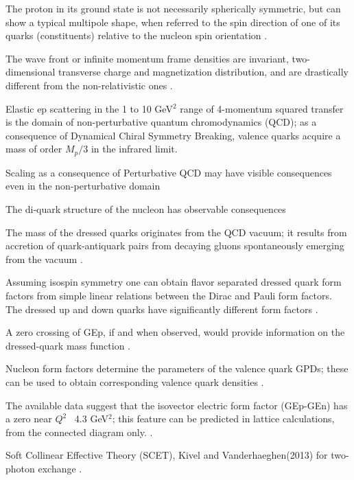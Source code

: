 The proton in its ground state is not necessarily spherically symmetric, but can show a typical multipole shape, 
when referred to the spin direction of one of its quarks (constituents) relative to the nucleon spin orientation
 \cite{miller03}. %

The wave front or infinite momentum frame densities are invariant, two-dimensional transverse charge and magnetization distribution, 
and are drastically different
from the non-relativistic ones \cite{miller:2003,carlson:2007}. %

Elastic ep scattering in the 1 to 10 GeV$^2$ range of 4-momentum squared transfer is
the domain of non-perturbative quantum chromodynamics (QCD); as a consequence of Dynamical Chiral Symmetry
Breaking, valence quarks acquire a mass of order $M_p/3$ in the infrared limit. \cite{cloet:2008b,cloet:2008}

   Scaling as a consequence of Perturbative QCD may have visible consequences even in the non-perturbative
 domain \cite{Galynskii:2013} 

The di-quark structure of the nucleon has observable consequences \cite{cloet:2012cy}

The mass of the dressed quarks originates from the QCD vacuum; it results
from accretion of quark-antiquark pairs from decaying gluons spontaneously emerging from the vacuum \cite{cloet:2008}. 

Assuming isospin symmetry one can obtain flavor separated dressed quark form
factors from simple linear relations between the Dirac and Pauli form factors.
The dressed up and down quarks have significantly different form factors 
\cite{cloet:2008,cates:2011,rohrmoser:2011,wilson:2011,cloet:2013,qattan:2013}. 

A zero crossing of GEp, if and when observed,  would provide information on the dressed-quark mass
function \cite{diehl:2013}.

Nucleon form factors determine the parameters of the valence quark GPDs;
these can be used to obtain corresponding valence quark densities \cite{diehl:2013}.

The available data suggest that the isovector electric form factor (GEp-GEn) has a zero near $Q^2$~ 4.3 GeV$^2$;
this feature can be predicted in lattice calculations, from the connected diagram only. \cite{diehl:2013}.
 
Soft  Collinear Effective Theory (SCET), Kivel and Vanderhaeghen(2013)
for two-photon exchange \cite{kivel:2012}.


